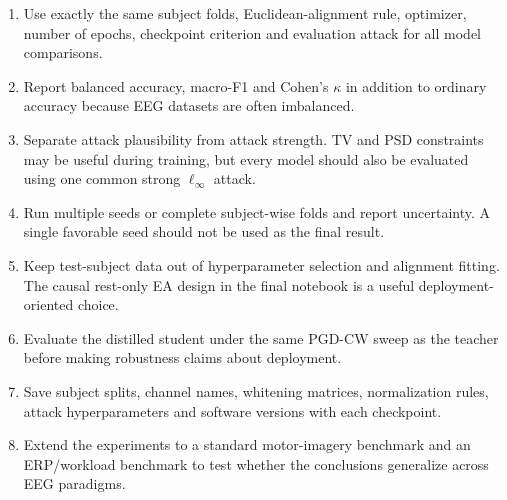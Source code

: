 \documentclass[10pt,a4paper,openright]{report}
\begin{document}
\begin{enumerate}
\item Use exactly the same subject folds, Euclidean-alignment rule, optimizer, number of epochs, checkpoint criterion and evaluation attack for all model comparisons.
\item Report balanced accuracy, macro-F1 and Cohen's $\kappa$ in addition to ordinary accuracy because EEG datasets are often imbalanced.
\item Separate attack plausibility from attack strength. TV and PSD constraints may be useful during training, but every model should also be evaluated using one common strong $\ell_\infty$ attack.
\item Run multiple seeds or complete subject-wise folds and report uncertainty. A single favorable seed should not be used as the final result.
\item Keep test-subject data out of hyperparameter selection and alignment fitting. The causal rest-only EA design in the final notebook is a useful deployment-oriented choice.
\item Evaluate the distilled student under the same PGD-CW sweep as the teacher before making robustness claims about deployment.
\item Save subject splits, channel names, whitening matrices, normalization rules, attack hyperparameters and software versions with each checkpoint.
\item Extend the experiments to a standard motor-imagery benchmark and an ERP/workload benchmark to test whether the conclusions generalize across EEG paradigms.
\end{enumerate}
\end{document}
